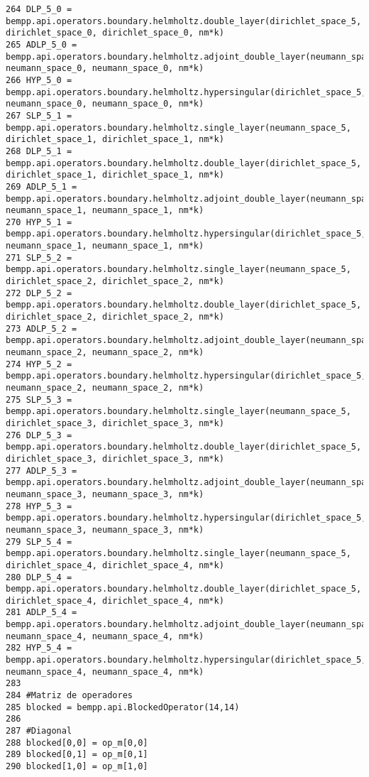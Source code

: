 \documentclass[12pt,letterpaper]{article}
\numberwithin{equation}{section}
\begin{document}
\begin{lstlisting}
264 DLP_5_0 = bempp.api.operators.boundary.helmholtz.double_layer(dirichlet_space_5, dirichlet_space_0, dirichlet_space_0, nm*k)
265 ADLP_5_0 = bempp.api.operators.boundary.helmholtz.adjoint_double_layer(neumann_space_5, neumann_space_0, neumann_space_0, nm*k)
266 HYP_5_0 = bempp.api.operators.boundary.helmholtz.hypersingular(dirichlet_space_5, neumann_space_0, neumann_space_0, nm*k)
267 SLP_5_1 = bempp.api.operators.boundary.helmholtz.single_layer(neumann_space_5, dirichlet_space_1, dirichlet_space_1, nm*k)
268 DLP_5_1 = bempp.api.operators.boundary.helmholtz.double_layer(dirichlet_space_5, dirichlet_space_1, dirichlet_space_1, nm*k)
269 ADLP_5_1 = bempp.api.operators.boundary.helmholtz.adjoint_double_layer(neumann_space_5, neumann_space_1, neumann_space_1, nm*k)
270 HYP_5_1 = bempp.api.operators.boundary.helmholtz.hypersingular(dirichlet_space_5, neumann_space_1, neumann_space_1, nm*k)
271 SLP_5_2 = bempp.api.operators.boundary.helmholtz.single_layer(neumann_space_5, dirichlet_space_2, dirichlet_space_2, nm*k)
272 DLP_5_2 = bempp.api.operators.boundary.helmholtz.double_layer(dirichlet_space_5, dirichlet_space_2, dirichlet_space_2, nm*k)
273 ADLP_5_2 = bempp.api.operators.boundary.helmholtz.adjoint_double_layer(neumann_space_5, neumann_space_2, neumann_space_2, nm*k)
274 HYP_5_2 = bempp.api.operators.boundary.helmholtz.hypersingular(dirichlet_space_5, neumann_space_2, neumann_space_2, nm*k)
275 SLP_5_3 = bempp.api.operators.boundary.helmholtz.single_layer(neumann_space_5, dirichlet_space_3, dirichlet_space_3, nm*k)
276 DLP_5_3 = bempp.api.operators.boundary.helmholtz.double_layer(dirichlet_space_5, dirichlet_space_3, dirichlet_space_3, nm*k)
277 ADLP_5_3 = bempp.api.operators.boundary.helmholtz.adjoint_double_layer(neumann_space_5, neumann_space_3, neumann_space_3, nm*k)
278 HYP_5_3 = bempp.api.operators.boundary.helmholtz.hypersingular(dirichlet_space_5, neumann_space_3, neumann_space_3, nm*k)
279 SLP_5_4 = bempp.api.operators.boundary.helmholtz.single_layer(neumann_space_5, dirichlet_space_4, dirichlet_space_4, nm*k)
280 DLP_5_4 = bempp.api.operators.boundary.helmholtz.double_layer(dirichlet_space_5, dirichlet_space_4, dirichlet_space_4, nm*k)
281 ADLP_5_4 = bempp.api.operators.boundary.helmholtz.adjoint_double_layer(neumann_space_5, neumann_space_4, neumann_space_4, nm*k)
282 HYP_5_4 = bempp.api.operators.boundary.helmholtz.hypersingular(dirichlet_space_5, neumann_space_4, neumann_space_4, nm*k)
283 
284 #Matriz de operadores
285 blocked = bempp.api.BlockedOperator(14,14)
286 
287 #Diagonal
288 blocked[0,0] = op_m[0,0]
289 blocked[0,1] = op_m[0,1]
290 blocked[1,0] = op_m[1,0]

\end{lstlisting}
\end{document}
